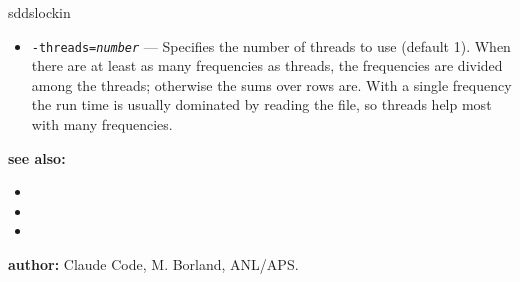 \begin{sddsprog}{sddslockin}
\begin{itemize}
      that it cannot leak into the result.  This matters when the data do not span an integer number of periods.
      \item {\tt -threads={\em number}} --- Specifies the number of threads to use (default 1).  When there are at
      least as many frequencies as threads, the frequencies are divided among the threads; otherwise the sums over rows
      are.  With a single frequency the run time is usually dominated by reading the file, so threads help most with
      many frequencies.
    \end{itemize}
  \item \textbf{see also:}
    \begin{itemize}
      \item {}
      \item {}
      \item {}
    \end{itemize}
  \item \textbf{author:} Claude Code, M. Borland, ANL/APS.
\end{sddsprog}
